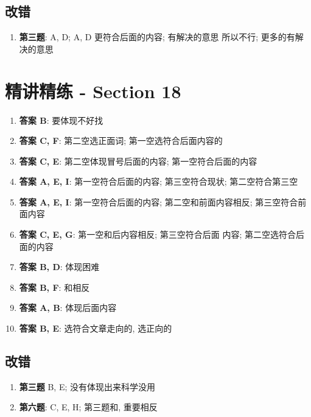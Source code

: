   \subsection{改错}

    \begin{enumerate}
      \item \textbf{第三题}: A, D; A, D 更符合后面的内容; 有解决的意思
      所以不行; 更多的有解决的意思
    \end{enumerate}

\section{精讲精练 - Section 18}

  \begin{enumerate}
    \item \textbf{答案 B}: 要体现不好找
    \item \textbf{答案 C, F}: 第二空选正面词; 第一空选符合后面内容的
    \item \textbf{答案 C, E}: 第二空体现冒号后面的内容; 第一空符合后面的内容
    \item \textbf{答案 A, E, I}: 第一空符合后面的内容; 第三空符合现状; 第二空符合第三空
    \item \textbf{答案 A, E, I}: 第一空符合后面的内容; 第二空和前面内容相反;
    第三空符合前面内容
    \item \textbf{答案 C, E, G}: 第一空和后内容相反; 第三空符合后面
    内容; 第二空选符合后面的内容
    \item \textbf{答案 B, D}: 体现困难
    \item \textbf{答案 B, F}: 和相反
    \item \textbf{答案 A, B}: 体现后面内容
    \item \textbf{答案 B, E}: 选符合文章走向的, 选正向的
  \end{enumerate}

  \subsection{改错}

    \begin{enumerate}
      \item \textbf{第三题} B, E; 没有体现出来科学没用
      \item \textbf{第六题}: C, E, H; 第三题和, 重要相反
    \end{enumerate}

